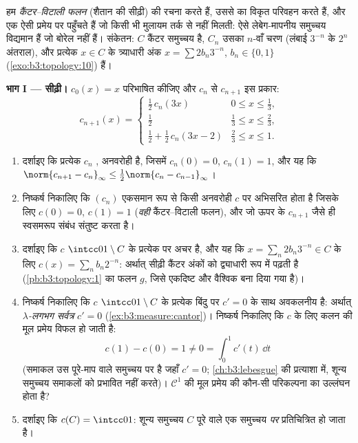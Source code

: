 \begin{problem}
\label{pb:b3:measure:1}
हम \emph{कैंटर--विटाली फलन} (शैतान की सीढ़ी) की रचना करते हैं,
उससे  का विकृत परिवहन करते हैं, और एक ऐसी प्रमेय पर पहुँचते
हैं जो किसी भी मुलायम तर्क से नहीं मिलती: ऐसे लेबेग-मापनीय
समुच्चय विद्यमान हैं जो बोरेल नहीं हैं। संकेतन: $C$ कैंटर
समुच्चय है, $C_n$ उसका $n$-वाँ चरण (लंबाई $3^{-n}$ के $2^n$
अंतराल), और प्रत्येक $x \in C$ के त्र्याधारी अंक $x = \sum 2b_n3^{-n}$, $b_n \in \{0,1\}$
(\cref{exo:b3:topology:10}) हैं।

\medskip
\noindent\textbf{भाग I --- सीढ़ी।} $c_0(x) = x$ परिभाषित कीजिए और $c_n$
से $c_{n+1}$ इस प्रकार:
\[
c_{n+1}(x) = \begin{cases}
\tfrac12\,c_n(3x) & 0 \leq x \leq \tfrac13,\\[2pt]
\tfrac12 & \tfrac13 \leq x \leq \tfrac23,\\[2pt]
\tfrac12 + \tfrac12\,c_n(3x - 2) & \tfrac23 \leq x \leq 1.
\end{cases}
\]
\begin{enumerate}
  \item दर्शाइए कि प्रत्येक $c_n$ , अनवरोही है, जिसमें
        $c_n(0) = 0$, $c_n(1) = 1$, और यह कि $\norm{c_{n+1} - c_n}_\infty \leq
        \tfrac12\norm{c_n - c_{n-1}}_\infty$।
  \item निष्कर्ष निकालिए कि $(c_n)$ एकसमान रूप से किसी 
        अनवरोही $c$ पर अभिसरित होता है जिसके लिए $c(0) = 0$, $c(1) = 1$
        (\emph{वही} कैंटर--विटाली फलन), और जो ऊपर के $c_{n+1}$ जैसे
        ही स्वसमरूप संबंध संतुष्ट करता है।
  \item दर्शाइए कि $c$ $\intcc01\setminus C$ के प्रत्येक  पर अचर है,
        और यह कि $x = \sum_n
        2b_n3^{-n} \in C$ के लिए $c(x) = \sum_n b_n2^{-n}$: अर्थात् सीढ़ी कैंटर अंकों को
        द्व्याधारी रूप में पढ़ती है (\cref{pb:b3:topology:1} का फलन $g$, जिसे
        एकदिष्ट और वैश्विक बना दिया गया है)।
  \item निष्कर्ष निकालिए कि $c$ $\intcc01\setminus C$ के प्रत्येक बिंदु पर
        $c' = 0$ के साथ अवकलनीय है: अर्थात् \emph{$\lambda$-लगभग सर्वत्र}
        $c' = 0$ (\cref{ex:b3:measure:cantor})। निष्कर्ष निकालिए कि $c$ के लिए कलन की
        मूल प्रमेय विफल हो जाती है:
        \[
        c(1) - c(0) = 1 \neq 0 = \int_0^1 c'(t)\,\dd t
        \]
        (समाकल उस पूरे-माप वाले समुच्चय पर है जहाँ $c' = 0$; \cref{ch:b3:lebesgue}
        की प्रत्याशा में, शून्य समुच्चय समाकलों को प्रभावित नहीं
        करते)। $\mathcal C^1$ की मूल प्रमेय की कौन-सी परिकल्पना का उल्लंघन
        होता है?
  \item दर्शाइए कि $c(C) = \intcc01$: शून्य समुच्चय $C$ पूरे  वाले एक
        समुच्चय \emph{पर} प्रतिचित्रित हो जाता है।
\end{enumerate}


\end{problem}
